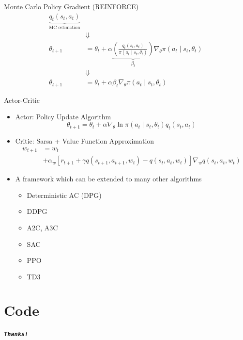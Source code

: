 \documentclass[UTF8, 10pt]{beamer}
\begin{document}
\begin{CJK*}{UTF8}{gbsn}
\begin{frame}{Monte Carlo Policy Gradient (REINFORCE)}
$$\begin{aligned}
	\underbrace{q_{t}\left(s_{t}, a_{t}\right)}_{\text{MC estimation}}
	\\& \Downarrow \\
	\theta_{t+1}&=\theta_{t}+\alpha \underbrace{\left(\frac{q_{t}\left(s_{t}, a_{t}\right)}{\pi\left(a_{t} \mid s_{t}, \theta_{t}\right)}\right)}_{\beta_{t}} \nabla_{\theta} \pi\left(a_{t} \mid s_{t}, \theta_{t}\right) 
	\\& \Downarrow \\
	\theta_{t+1}&=\theta_{t}+\alpha \beta_{t} \nabla_{\theta} \pi\left(a_{t} \mid s_{t}, \theta_{t}\right)
	\end{aligned} 
	$$
\end{frame}
\begin{frame}{Actor-Critic}
	\begin{itemize}
		\item Actor: Policy Update Algorithm
			$$
			\theta_{t+1}=\theta_{t}+\alpha \nabla_{\theta} \ln \pi\left(a_{t} \mid s_{t}, \theta_{t}\right) q_{t}\left(s_{t}, a_{t}\right)
			$$
		\item Critic: Sarsa + Value Function Approximation
			$$
			\begin{aligned}
			w_{t+1}&=w_{t}
			\\
			&+\alpha_{w}\left[r_{t+1}+\gamma q\left(s_{t+1}, a_{t+1}, w_{t}\right)-q\left(s_{t}, a_{t}, w_{t}\right)\right] \nabla_{w} q\left(s_{t}, a_{t}, w_{t}\right)
			\end{aligned}
			$$
		\item A framework which can be extended to many other algorithms
			
			\begin{itemize}
				\item Deterministic AC (DPG)
				\item DDPG
				\item A2C, A3C
				\item SAC
				\item PPO
				\item TD3
			\end{itemize}
	\end{itemize}
\end{frame}

\section{Code}


\begin{frame}[allowframebreaks]%
	\begin{center}
		\Huge\textbf{\textit{\texttt{Thanks!}}}
	\end{center}
\end{frame}


\end{CJK*}
\end{document}
